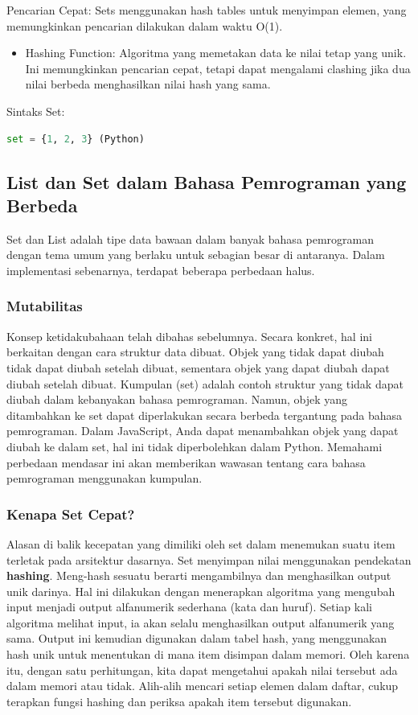 \documentclass{article}
\begin{document}
Pencarian Cepat: Sets menggunakan hash tables untuk menyimpan elemen, yang memungkinkan pencarian dilakukan dalam waktu O(1).
\begin{itemize}
    \item Hashing Function: Algoritma yang memetakan data ke nilai tetap yang unik. Ini memungkinkan pencarian cepat, tetapi dapat mengalami clashing jika dua nilai berbeda menghasilkan nilai hash yang sama.
\end{itemize}

Sintaks Set:
\begin{lstlisting}[language=Python, caption={}, captionpos=b]
    set = {1, 2, 3} (Python)
\end{lstlisting}

\subsection{List dan Set dalam Bahasa Pemrograman yang Berbeda}
Set dan List adalah tipe data bawaan dalam banyak bahasa pemrograman dengan tema umum yang berlaku untuk sebagian besar di antaranya. Dalam implementasi sebenarnya, terdapat beberapa perbedaan halus.
\subsubsection{Mutabilitas}
Konsep ketidakubahaan telah dibahas sebelumnya. Secara konkret, hal ini berkaitan dengan cara struktur data dibuat. Objek yang tidak dapat diubah tidak dapat diubah setelah dibuat, sementara objek yang dapat diubah dapat diubah setelah dibuat. Kumpulan (set) adalah contoh struktur yang tidak dapat diubah dalam kebanyakan bahasa pemrograman. Namun, objek yang ditambahkan ke set dapat diperlakukan secara berbeda tergantung pada bahasa pemrograman. Dalam JavaScript, Anda dapat menambahkan objek yang dapat diubah ke dalam set, hal ini tidak diperbolehkan dalam Python. Memahami perbedaan mendasar ini akan memberikan wawasan tentang cara bahasa pemrograman menggunakan kumpulan.

\subsubsection{Kenapa Set Cepat?}
Alasan di balik kecepatan yang dimiliki oleh set dalam menemukan suatu item terletak pada arsitektur dasarnya. Set menyimpan nilai menggunakan pendekatan \textbf{hashing}. Meng-hash sesuatu berarti mengambilnya dan menghasilkan output unik darinya. Hal ini dilakukan dengan menerapkan algoritma yang mengubah input menjadi output alfanumerik sederhana (kata dan huruf). Setiap kali algoritma melihat input, ia akan selalu menghasilkan output alfanumerik yang sama. Output ini kemudian digunakan dalam tabel hash, yang menggunakan hash unik untuk menentukan di mana item disimpan dalam memori. Oleh karena itu, dengan satu perhitungan, kita dapat mengetahui apakah nilai tersebut ada dalam memori atau tidak. Alih-alih mencari setiap elemen dalam daftar, cukup terapkan fungsi hashing dan periksa apakah item tersebut digunakan.
\end{document}

